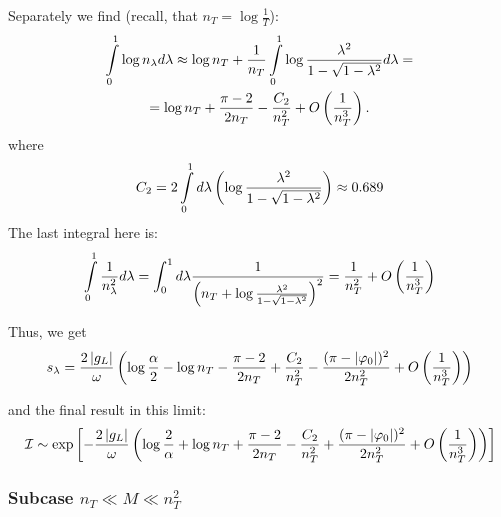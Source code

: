 Separately we find (recall, that $ n_T=\log\frac{1}{T} $):
\begin{multline}
	\intop_{0}^{1}\log n_{\lambda}d\lambda
	\approx
	\log n_T
	+
	\frac{1}{n_T}
	\intop_{0}^{1}\log\frac{\lambda^{2}}{1-\sqrt{1-\lambda^{2}}}d\lambda
	=
	\\
	=
	\log n_T
	+
	\frac{\pi-2}{2n_T}
	-
	\frac{C_2}{n_T^2}
	+
	O
	\br{\frac{1}{n_T^3}}
	.
\end{multline}
where
\begin{gather}
	C_2
	=
	2\int\limits^1_0
	d\lambda
	\left(
	\log
		\frac{\lambda^2}{1-\sqrt{1-\lambda^2}}\right)
\approx
0.689
\end{gather}
The last integral here is:
\begin{gather}
\intop_{0}^{1}\frac{1}{n_{\lambda}^{2}}d\lambda
=
\int_0^1 d\lambda
\frac{1}
{\br{n_T+\log\frac{\lambda^2}{1-\sqrt{1-\lambda^2}}}^2}
=
\frac{1}{n_T^2}
+
O\br{\frac{1}{n_T^3}}
\end{gather}


Thus, we get 
\begin{gather}
s_{\lambda}
=
\frac{2\left|g_L\right|}{\omega}
\left(\log\frac{\alpha}{2}
-
\log n_T
-
\frac{\pi-2}{2n_T}
+
\frac{C_2}{n_T^2}
-
\frac{(\pi-|\varphi_{0}|)^{2}}
{2n_T^{2}}
+
O\left(\frac{1}{n_T^{3}}\right)\right)
\end{gather}

and the final result in this limit:
\begin{gather}
\label{final_ion_pure_mar_1}
	\mathcal{I}
	\sim
	\exp
	\left[
	-
\frac{2\left|g_L\right|}{\omega}\left(
	\log\frac{2}{\alpha}
	+
	\log n_T
	+
	\frac{\pi-2}{2n_T}
	-
	\frac{C_2}{n_T^2}
	+
	\frac{(\pi-|\varphi_{0}|)^{2}}
	{2n_T^{2}}
	+
	O\left(\frac{1}{n_T^{3}}\right)\right)	
\right]
\end{gather}



\subsubsection{Subcase $ n_T\ll M \ll n_T^2  $}

